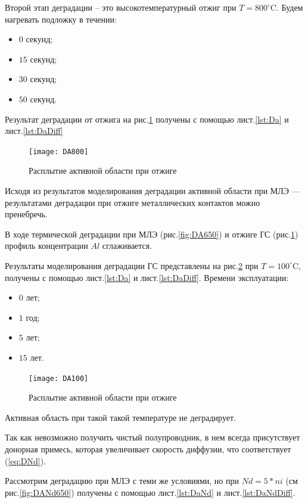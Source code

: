 Второй этап деградации -- это высокотемпературный отжиг при $T=800^{\circ}$C. Будем нагревать подложку в течении:

\begin{itemize}
	\item $0$ секунд;
	\item $15$ секунд;
	\item $30$ секунд;
	\item $50$ секунд.
\end{itemize}

Результат деградации от отжига на рис.\ref{fig:DA800} получены с помощью лист.\ref{lst:Da} и лист.\ref{lst:DaDiff}

\begin{figure}[h!]
	\centering
	\texttt{[image: DA800]}
	\caption{Расплытие активной области при отжиге}
	\label{fig:DA800}
\end{figure}

Исходя из результатов моделирования деградации активной области при МЛЭ --- результатами деградации при отжиге металлических контактов можно пренебречь.

В ходе термической деградации при МЛЭ (рис.\ref{fig:DA650}) и отжиге ГС (рис.\ref{fig:DA800}) профиль концентрации $Al$ сглаживается.

Результаты моделирования деградации ГС представлены на рис.\ref{fig:DA100} при $T=100^{\circ}$C, получены с помощью лист.\ref{lst:Da} и лист.\ref{lst:DaDiff}. Времени эксплуатации:

\begin{itemize}
	\item $0$ лет;
	\item $1$ год;
	\item $5$ лет;
	\item $15$ лет.
\end{itemize}

\begin{figure}[h!]
	\centering
	\texttt{[image: DA100]}
	\caption{Расплытие активной области при отжиге}
	\label{fig:DA100}
\end{figure}

Активная область при такой такой температуре не деградирует.

Так как невозможно получить чистый полупроводник, в нем всегда присутствует донорная примесь, которая увеличивает скорость диффузии, что соответствует (\ref{eq:DNd}).

Рассмотрим деградацию при МЛЭ с теми же условиями, но при $Nd = 5*ni$ (см рис.\ref{fig:DANd650}) получены с помощью лист.\ref{lst:DaNd} и лист.\ref{lst:DaNdDiff}.

